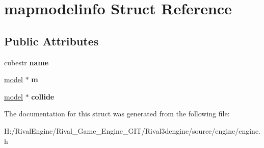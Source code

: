 \hypertarget{structmapmodelinfo}{}\section{mapmodelinfo Struct Reference}
\label{structmapmodelinfo}
\subsection*{Public Attributes}
\begin{DoxyCompactItemize}
\item 
\mbox{\label{structmapmodelinfo_a391324d4c9feeebca7a9d7dbf6310fe7}} 
cubestr {\bfseries name}
\item 
\mbox{\label{structmapmodelinfo_a975b3404589026107a818e75d9ab9a20}} 
\hyperlink{structmodel}{model} $\ast$ {\bfseries m}
\item 
\mbox{\label{structmapmodelinfo_a19ac2366bd23f5de0630fc50dfa5fda9}} 
\hyperlink{structmodel}{model} $\ast$ {\bfseries collide}
\end{DoxyCompactItemize}


The documentation for this struct was generated from the following file\+:\begin{DoxyCompactItemize}
\item 
H\+:/\+Rival\+Engine/\+Rival\+\_\+\+Game\+\_\+\+Engine\+\_\+\+G\+I\+T/\+Rival3dengine/source/engine/engine.\+h\end{DoxyCompactItemize}
